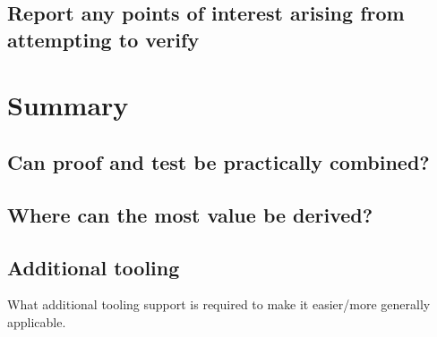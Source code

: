 \documentclass{llncs}
\begin{document}
\subsection{Report any points of interest arising from attempting to verify}

\section{Summary}

\subsection{Can proof and test be practically combined?}

\subsection{Where can the most value be derived?}

\subsection{Additional tooling}
What additional tooling support is required to make it easier/more
generally applicable.




\end{document}
